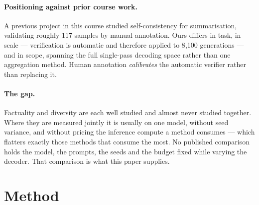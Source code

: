 \documentclass[11pt]{article}
\begin{document}
\paragraph{Positioning against prior course work.}
A previous project in this course \citep{mark-frenkel} studied self-consistency
for summarisation, validating roughly 117 samples by manual annotation. Ours
differs in task, in scale --- verification is automatic and therefore applied
to 8{,}100 generations --- and in scope, spanning the full single-pass decoding
space rather than one aggregation method. Human annotation \emph{calibrates}
the automatic verifier rather than replacing it.

\paragraph{The gap.}
Factuality and diversity are each well studied and almost never studied
together. Where they are measured jointly it is usually on one model, without
seed variance, and without pricing the inference compute a method consumes ---
which flatters exactly those methods that consume the most. No published
comparison holds the model, the prompts, the seeds and the budget fixed while
varying the decoder. That comparison is what this paper supplies.

\section{Method}
\end{document}
